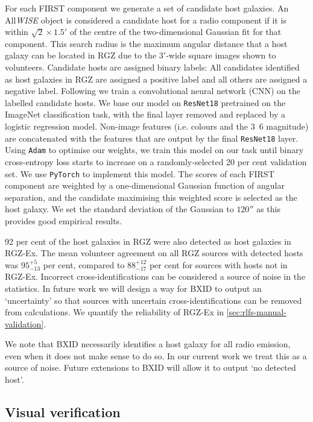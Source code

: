 For each FIRST component we generate a set of candidate host galaxies.
An All\emph{WISE} object is considered a candidate host for a radio
component if it is within $\sqrt{2} \times 1.5'$ of the centre of the two-dimensional
Gaussian fit for that component. This search radius is the maximum
angular distance that a host galaxy can be located in RGZ due to the
$3'$-wide square images shown to volunteers. Candidate hosts are
assigned binary labels: All candidates identified as host galaxies in
RGZ are assigned a positive label and all others are assigned a
negative label. Following \citet{alger18radio} we train a convolutional neural
network (CNN) on the labelled candidate hosts. We
base our model on \texttt{ResNet18} \citep{he2016resnet} pretrained on the
ImageNet classification task, with the final layer removed and replaced
by a logistic regression model. Non-image features (i.e. colours and the
\unit{3.6}{\micro\meter} magnitude) are concatenated with the features
that are output by the final \texttt{ResNet18} layer. Using \texttt{Adam}
\citep{kingma14adam} to optimise our weights, we train this model on our
task until binary cross-entropy loss starts to increase on a
randomly-selected 20 per cent validation set. We use \texttt{PyTorch}
\citep{paszke2017pytorch} to implement this model. The scores of each FIRST
component are weighted by a one-dimensional Gaussian function of angular separation, and the
candidate maximising this weighted score is selected as the host galaxy. We
set the standard deviation of the Gaussian to $120''$ as this provides good
empirical results.

92 per cent of the host galaxies in RGZ were also detected as host galaxies in RGZ-Ex. The mean volunteer agreement on all RGZ sources with detected hosts was $95^{+5}_{-13}$ per cent, compared to $88^{+12}_{-17}$ per cent for sources with hosts not in RGZ-Ex. Incorrect cross-identifications can be considered a source of noise in the statistics. In future work we will design a way for BXID to output an `uncertainty' so that sources with uncertain cross-identifications can be removed from calculations. We quantify the reliability of RGZ-Ex in \autoref{sec:rlfs-manual-validation}.

We note that BXID necessarily identifies a host galaxy for all radio emission, even when it does not
make sense to do so. In our current work we treat this as a source of
noise. Future extensions to BXID will allow it to output `no detected
host'.

    \subsection{Visual verification}\label{sec:rlfs-manual-validation}

